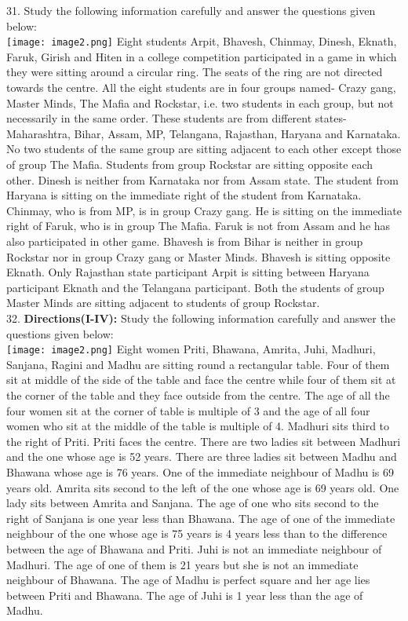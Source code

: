 \documentclass[
]{article}
\begin{document}
31. Study the following information carefully and answer the questions given below:\\
\texttt{[image: image2.png]}
Eight students Arpit, Bhavesh, Chinmay, Dinesh, Eknath, Faruk, Girish and Hiten in a
college competition participated in a game in which they were sitting around a circular ring.
The seats of the ring are not directed towards the centre. All the eight students are in four
groups named- Crazy gang, Master Minds, The Mafia and Rockstar, i.e. two students in
each group, but not necessarily in the same order. These students are from different states-
Maharashtra, Bihar, Assam, MP, Telangana, Rajasthan, Haryana and Karnataka. No two
students of the same group are sitting adjacent to each other except those of group The
Mafia. Students from group Rockstar are sitting opposite each other. Dinesh is neither from
Karnataka nor from Assam state. The student from Haryana is sitting on the immediate
right of the student from Karnataka. Chinmay, who is from MP, is in group Crazy gang. He
is sitting on the immediate right of Faruk, who is in group The Mafia. Faruk is not from
Assam and he has also participated in other game. Bhavesh is from Bihar is neither in group
Rockstar nor in group Crazy gang or Master Minds. Bhavesh is sitting opposite Eknath.
Only Rajasthan state participant Arpit is sitting between Haryana participant Eknath and
the Telangana participant. Both the students of group Master Minds are sitting adjacent to
students of group Rockstar.\\

32. \textbf{Directions(I-IV):} Study the following information carefully and answer the questions given
below:\\
\texttt{[image: image2.png]}
Eight women Priti, Bhawana, Amrita, Juhi, Madhuri, Sanjana, Ragini and Madhu are sitting
round a rectangular table. Four of them sit at middle of the side of the table and face the
centre while four of them sit at the corner of the table and they face outside from the centre.
The age of all the four women sit at the corner of table is multiple of 3 and the age of all four
women who sit at the middle of the table is multiple of 4. Madhuri sits third to the right of
Priti. Priti faces the centre. There are two ladies sit between Madhuri and the one whose age
is 52 years. There are three ladies sit between Madhu and Bhawana whose age is 76 years.
One of the immediate neighbour of Madhu is 69 years old. Amrita sits second to the left of
the one whose age is 69 years old. One lady sits between Amrita and Sanjana. The age of one
who sits second to the right of Sanjana is one year less than Bhawana. The age of one of the
immediate neighbour of the one whose age is 75 years is 4 years less than to the difference
between the age of Bhawana and Priti. Juhi is not an immediate neighbour of Madhuri. The
age of one of them is 21 years but she is not an immediate neighbour of Bhawana. The age of
Madhu is perfect square and her age lies between Priti and Bhawana. The age of Juhi is 1
year less than the age of Madhu.\\
\end{document}
